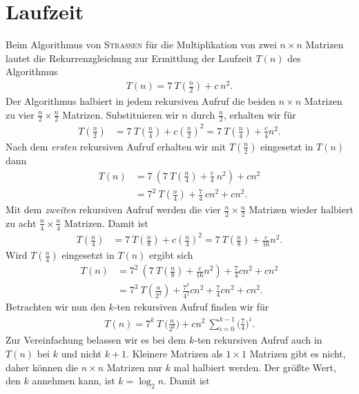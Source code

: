 \documentclass{scrartcl}
\begin{document}
\section{Laufzeit}
Beim Algorithmus von \textsc{Strassen} für die Multiplikation von zwei $n \times n$ Matrizen lautet die Rekurrenzgleichung zur Ermittlung der Laufzeit $T(n)$ des Algorithmus
\begin{align*}
	T(n) = 7 \: T(\tfrac{n}{2}) + c\: n^2.
\end{align*}
Der Algorithmus halbiert in jedem rekursiven Aufruf die beiden $n \times n$ Matrizen zu vier $\tfrac{n}{2} \times \tfrac{n}{2}$ Matrizen. Substituieren wir $n$ durch $\tfrac{n}{2}$, erhalten wir für
\begin{align*}
	T(\tfrac{n}{2}) &= 7 \: T(\tfrac{n}{4}) + c(\tfrac{n}{2})^2 = 7 \: T(\tfrac{n}{4}) + \tfrac{c}{4}n^2.
\end{align*}
Nach dem \textit{ersten} rekursiven Aufruf erhalten wir mit $T(\frac{n}{2})$ eingesetzt in $T(n)$ dann
\begin{align*}
	T(n) &= 7 \: (7 \: T(\tfrac{n}{4}) + \tfrac{c}{4} \: n^2) + c n^2 \\
	&= 7^2\: T(\tfrac{n}{4}) + \tfrac{7}{4} \: cn^2 + c n^2.
\end{align*}
Mit dem \textit{zweiten} rekursiven Aufruf werden die vier $\tfrac{n}{2} \times \tfrac{n}{2}$ Matrizen wieder halbiert zu acht $\tfrac{n}{4} \times \tfrac{n}{4}$ Matrizen. Damit ist
\begin{align*}
	T(\tfrac{n}{4}) &= 7 \: T(\tfrac{n}{8}) + c(\tfrac{n}{4})^2 = 7 \: T(\tfrac{n}{8}) + \tfrac{c}{16}n^2.
\end{align*}
Wird $T(\tfrac{n}{4})$ eingesetzt in $T(n)$ ergibt sich
\begin{align*}
	T(n) &= 7^2\: (7 \: T(\tfrac{n}{8}) + \tfrac{c}{16}n^2) + \tfrac{7}{4}cn^2 + c n^2 \\
	&= 7^3\: T(\tfrac{n}{2^3}) + \tfrac{7^2}{4^2}cn^2 + \tfrac{7}{4}cn^2 + c n^2.
\end{align*}
Betrachten wir nun den $k$-ten rekursiven Aufruf finden wir für 
\begin{align*}
	T(n) = 7^k \: T \: \big(\tfrac{n}{2^k}\big) + cn^2 \: \sum_{i = 0}^{k-1} \bigg(\frac{7}{4}\bigg)^i.
\end{align*}
Zur Vereinfachung belassen wir es bei dem $k$-ten rekursiven Aufruf auch in $T(n)$ bei $k$ und nicht $k + 1$. Kleinere Matrizen als $1 \times 1$ Matrizen gibt es nicht, daher können die $n \times n$ Matrizen nur $k$ mal halbiert werden. Der größte Wert, den $k$ annehmen kann, ist $k = \log_{2}n$. Damit ist
\end{document}
